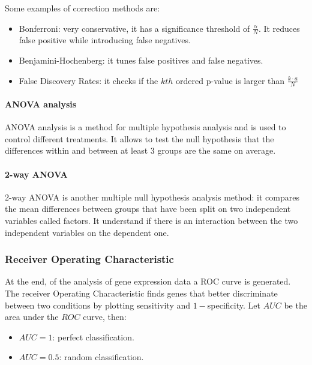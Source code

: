 		Some examples of correction methods are:

		\begin{multicols}{2}
			\begin{itemize}
				\item Bonferroni: very conservative, it has a significance threshold of $\frac{\alpha}{N}$.
					It reduces false positive while introducing false negatives.
				\item Benjamini-Hochenberg: it tunes false positives and false negatives.
				\item False Discovery Rates: it checks if the $kth$ ordered p-value is larger than $\frac{k\cdot a}{N}$
			\end{itemize}
		\end{multicols}

		\paragraph{ANOVA analysis}
			ANOVA analysis is a method for multiple hypothesis analysis and is used to control different treatments.
			It allows to test the null hypothesis that the differences within and between at least $3$ groups are the same on average.

			\paragraph{2-way ANOVA}
			2-way ANOVA is another multiple null hypothesis analysis method: it compares the mean differences between groups that have been split on two independent variables called factors.
			It understand if there is an interaction between the two independent variables on the dependent one.


		\subsubsection{Receiver Operating Characteristic}
		At the end, of the analysis of gene expression data a ROC curve is generated.
		The receiver Operating Characteristic finds genes that better discriminate between two conditions by plotting sensitivity and $1-$specificity.
		Let $AUC$ be the area under the $ROC$ curve, then:

		\begin{multicols}{2}
			\begin{itemize}
				\item $AUC=1$: perfect classification.
				\item $AUC = 0.5$: random classification.
			\end{itemize}
		\end{multicols}

